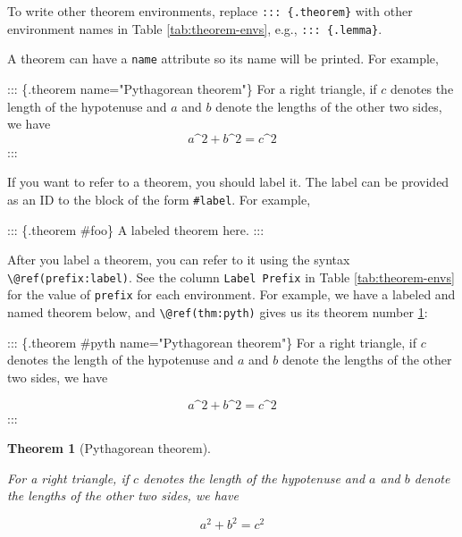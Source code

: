 \documentclass[
  12pt,
]{krantz}
\newenvironment{Shaded}{\begin{snugshade}}{\end{snugshade}}
\newcommand{\NormalTok}[1]{#1}
\newtheorem{theorem}{Theorem}[chapter]
\theoremstyle{definition}
\theoremstyle{definition}
\theoremstyle{definition}
\theoremstyle{definition}
\theoremstyle{remark}
\begin{document}
To write other theorem environments, replace \texttt{:::\ \{.theorem\}} with other environment names in Table \ref{tab:theorem-envs}, e.g., \texttt{:::\ \{.lemma\}}.

A theorem can have a \texttt{name} attribute so its name will be printed. For example,

\begin{Shaded}
\begin{Highlighting}[]
\NormalTok{::: \{.theorem name="Pythagorean theorem"\}}
\NormalTok{For a right triangle, if $c$ denotes the length of the hypotenuse}
\NormalTok{and $a$ and $b$ denote the lengths of the other two sides, we have}
\NormalTok{$$a\^{}2 + b\^{}2 = c\^{}2$$}
\NormalTok{:::}
\end{Highlighting}
\end{Shaded}

If you want to refer to a theorem, you should label it. The label can be provided as an ID to the block of the form \texttt{\#label}. For example,

\begin{Shaded}
\begin{Highlighting}[]
\NormalTok{::: \{.theorem \#foo\}}
\NormalTok{A labeled theorem here.}
\NormalTok{:::}
\end{Highlighting}
\end{Shaded}

After you label a theorem, you can refer to it using the syntax \texttt{\textbackslash{}@ref(prefix:label)}. See the column \texttt{Label\ Prefix} in Table \ref{tab:theorem-envs} for the value of \texttt{prefix} for each environment. For example, we have a labeled and named theorem below, and \texttt{\textbackslash{}@ref(thm:pyth)} gives us its theorem number \ref{thm:pyth}:

\begin{Shaded}
\begin{Highlighting}[]
\NormalTok{::: \{.theorem \#pyth name="Pythagorean theorem"\}}
\NormalTok{For a right triangle, if $c$ denotes the length of the hypotenuse}
\NormalTok{and $a$ and $b$ denote the lengths of the other two sides, we have}

\NormalTok{$$a\^{}2 + b\^{}2 = c\^{}2$$}
\NormalTok{:::}
\end{Highlighting}
\end{Shaded}

\begin{theorem}[Pythagorean theorem]
\protect\hypertarget{thm:pyth}{}\label{thm:pyth}

For a right triangle, if \(c\) denotes the length of the hypotenuse
and \(a\) and \(b\) denote the lengths of the other two sides, we have

\[a^2 + b^2 = c^2\]

\end{theorem}
\end{document}
